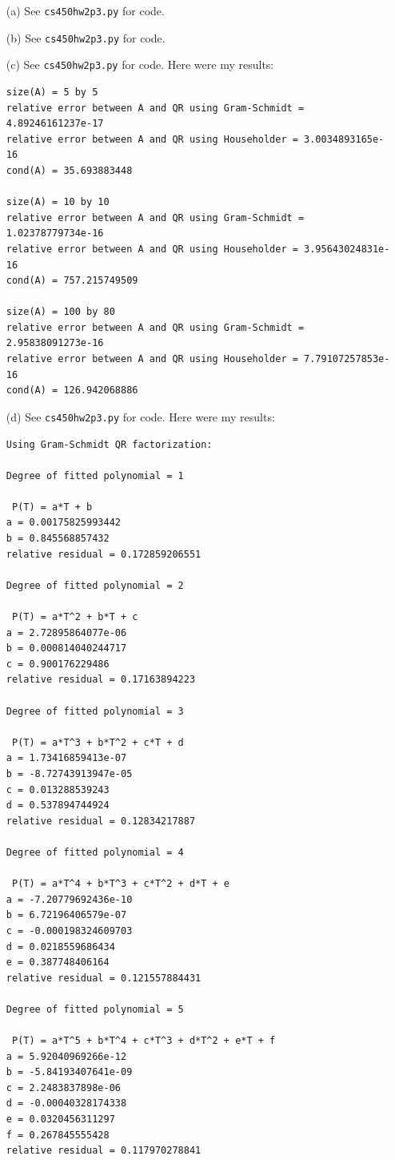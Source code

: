 \documentclass[10pt]{article}
\begin{document}
\begin{enumerate}
\item[(a)] See \verb+cs450hw2p3.py+ for code.
\item[(b)] See \verb+cs450hw2p3.py+ for code.
\item[(c)] See \verb+cs450hw2p3.py+ for code. Here were my results:

\begin{verbatim}
size(A) = 5 by 5
relative error between A and QR using Gram-Schmidt = 4.89246161237e-17
relative error between A and QR using Householder = 3.0034893165e-16
cond(A) = 35.693883448

size(A) = 10 by 10
relative error between A and QR using Gram-Schmidt = 1.02378779734e-16
relative error between A and QR using Householder = 3.95643024831e-16
cond(A) = 757.215749509

size(A) = 100 by 80
relative error between A and QR using Gram-Schmidt = 2.95838091273e-16
relative error between A and QR using Householder = 7.79107257853e-16
cond(A) = 126.942068886
\end{verbatim}

\item[(d)] See \verb+cs450hw2p3.py+ for code. Here were my results:

\begin{verbatim}
Using Gram-Schmidt QR factorization:

Degree of fitted polynomial = 1

 P(T) = a*T + b
a = 0.00175825993442
b = 0.845568857432
relative residual = 0.172859206551

Degree of fitted polynomial = 2

 P(T) = a*T^2 + b*T + c
a = 2.72895864077e-06
b = 0.000814040244717
c = 0.900176229486
relative residual = 0.17163894223

Degree of fitted polynomial = 3

 P(T) = a*T^3 + b*T^2 + c*T + d
a = 1.73416859413e-07
b = -8.72743913947e-05
c = 0.013288539243
d = 0.537894744924
relative residual = 0.12834217887

Degree of fitted polynomial = 4

 P(T) = a*T^4 + b*T^3 + c*T^2 + d*T + e
a = -7.20779692436e-10
b = 6.72196406579e-07
c = -0.000198324609703
d = 0.0218559686434
e = 0.387748406164
relative residual = 0.121557884431

Degree of fitted polynomial = 5

 P(T) = a*T^5 + b*T^4 + c*T^3 + d*T^2 + e*T + f
a = 5.92040969266e-12
b = -5.84193407641e-09
c = 2.2483837898e-06
d = -0.00040328174338
e = 0.0320456311297
f = 0.267845555428
relative residual = 0.117970278841
\end{verbatim}


\end{enumerate}
\end{document}
